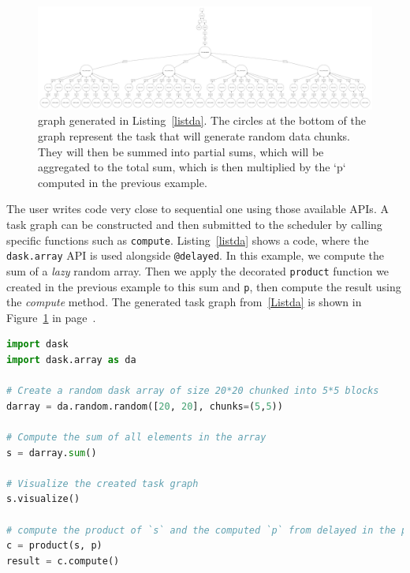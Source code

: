 \begin{figure}[h!]\centering
\includegraphics[scale=0.1, angle=90]{figures/func.pdf}
\caption{\dask graph generated in Listing~\ref{listda}. The circles at the bottom of the graph represent the task that will generate random data chunks. They will then be summed into partial sums, which will be aggregated to the total sum, which is then multiplied by the `p` computed in the previous example.}
\label{figda}
\end{figure}

The user writes code very close to sequential one using those available APIs. A task graph can be constructed and then submitted to the scheduler by calling specific functions such as \texttt{compute}. 
Listing~\ref{listda} shows a \dask code, where the \texttt{dask.array} API is used alongside \texttt{@delayed}. In this example, we compute the sum of a \textit{lazy} random array. Then we apply the decorated \texttt{product} function we created in the previous example to this sum and \texttt{p}, then compute the result using the \textit{compute} method. The generated task graph from~\ref{Listda} is shown in Figure~\ref{figda} in page~\pageref{figda}.  

\begin{lstlisting}[float=p!, label=listda, language=python, caption=Dask example using the Dask.array submodule]
import dask
import dask.array as da

# Create a random dask array of size 20*20 chunked into 5*5 blocks 
darray = da.random.random([20, 20], chunks=(5,5))

# Compute the sum of all elements in the array 
s = darray.sum()

# Visualize the created task graph 
s.visualize()

# compute the product of `s` and the computed `p` from delayed in the previous example
c = product(s, p)
result = c.compute()

\end{lstlisting}\clearpage

